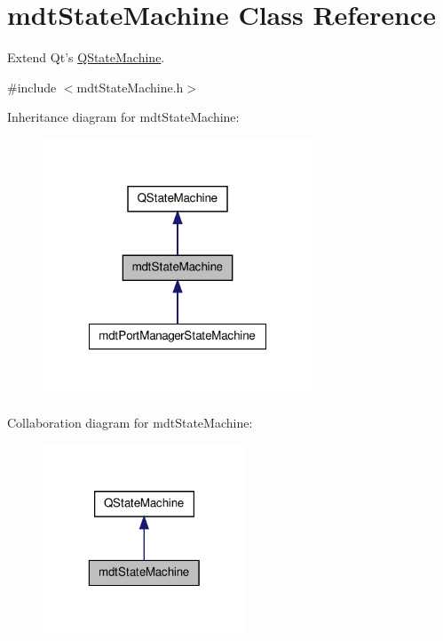 \hypertarget{classmdt_state_machine}{\section{mdt\-State\-Machine Class Reference}
\label{classmdt_state_machine}
}


Extend Qt's \hyperlink{class_q_state_machine}{Q\-State\-Machine}.  




{\ttfamily \#include $<$mdt\-State\-Machine.\-h$>$}



Inheritance diagram for mdt\-State\-Machine\-:\nopagebreak
\begin{figure}[H]
\begin{center}
\leavevmode
\includegraphics[width=228pt]{classmdt_state_machine__inherit__graph}
\end{center}
\end{figure}


Collaboration diagram for mdt\-State\-Machine\-:\nopagebreak
\begin{figure}[H]
\begin{center}
\leavevmode
\includegraphics[width=172pt]{classmdt_state_machine__coll__graph}
\end{center}
\end{figure}
